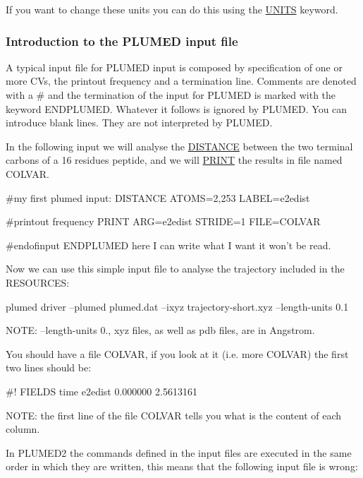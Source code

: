 If you want to change these units you can do this using the \hyperlink{UNITS}{U\+N\+I\+T\+S} keyword.\hypertarget{belfast-1_introinput}{}\subsubsection{Introduction to the P\+L\+U\+M\+E\+D input file}\label{belfast-1_introinput}
A typical input file for P\+L\+U\+M\+E\+D input is composed by specification of one or more C\+Vs, the printout frequency and a termination line. Comments are denoted with a \# and the termination of the input for P\+L\+U\+M\+E\+D is marked with the keyword E\+N\+D\+P\+L\+U\+M\+E\+D. Whatever it follows is ignored by P\+L\+U\+M\+E\+D. You can introduce blank lines. They are not interpreted by P\+L\+U\+M\+E\+D.

In the following input we will analyse the \hyperlink{DISTANCE}{D\+I\+S\+T\+A\+N\+C\+E} between the two terminal carbons of a 16 residues peptide, and we will \hyperlink{PRINT}{P\+R\+I\+N\+T} the results in file named C\+O\+L\+V\+A\+R.

\begin{DoxyVerb}#my first plumed input:
DISTANCE ATOMS=2,253 LABEL=e2edist

#printout frequency
PRINT ARG=e2edist STRIDE=1 FILE=COLVAR 

#endofinput 
ENDPLUMED
here I can write what I want it won't be read.
\end{DoxyVerb}


Now we can use this simple input file to analyse the trajectory included in the R\+E\+S\+O\+U\+R\+C\+E\+S\+:

\begin{DoxyVerb}plumed driver --plumed plumed.dat --ixyz trajectory-short.xyz --length-units 0.1
\end{DoxyVerb}


N\+O\+T\+E\+: --length-\/units 0., xyz files, as well as pdb files, are in Angstrom.

You should have a file C\+O\+L\+V\+A\+R, if you look at it (i.\+e. more C\+O\+L\+V\+A\+R) the first two lines should be\+:

\begin{DoxyVerb}#! FIELDS time e2edist 
 0.000000 2.5613161
\end{DoxyVerb}


N\+O\+T\+E\+: the first line of the file C\+O\+L\+V\+A\+R tells you what is the content of each column.

In P\+L\+U\+M\+E\+D2 the commands defined in the input files are executed in the same order in which they are written, this means that the following input file is wrong\+:

